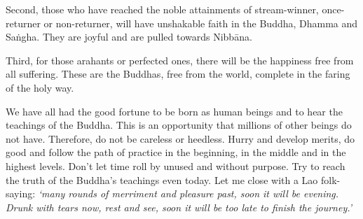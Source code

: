 Second, those who have reached the noble attainments of stream-winner, once-returner or non-returner, will have unshakable faith in the Buddha, Dhamma and Sa\.ngha. They are joyful and are pulled towards Nibb\=ana.

Third, for those arahants or perfected ones, there will be the happiness free from all suffering. These are the Buddhas, free from the world, complete in the faring of the holy way. 

We have all had the good fortune to be born as human beings and to hear the teachings of the Buddha. This is an opportunity that millions of other beings do not have. Therefore, do not be careless or heedless. Hurry and develop merits, do good and follow the path of practice in the beginning, in the middle and in the highest levels. Don't let time roll by unused and without purpose. Try to reach the truth of the Buddha's teachings even today. Let me close with a Lao folk-saying: \textit{`many rounds of merriment and pleasure past, soon it will be evening. Drunk with tears now, rest and see, soon it will be too late to finish the journey.'} 
